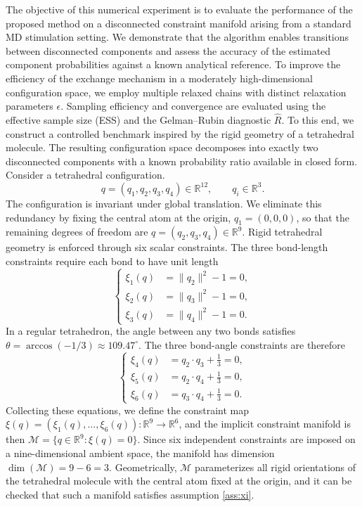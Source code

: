 \documentclass[12pt]{article}
\begin{document}
The objective of this numerical experiment is to evaluate the performance of the proposed method on a disconnected constraint manifold arising from a standard MD stimulation setting. We demonstrate that the algorithm enables transitions between disconnected components and assess the accuracy of the estimated component probabilities against a known analytical reference.
To improve the efficiency of the exchange mechanism in a moderately high-dimensional configuration space, we employ multiple relaxed chains with distinct relaxation parameters $\epsilon$. Sampling efficiency and convergence are evaluated using the effective sample size (ESS) and the Gelman--Rubin diagnostic $\hat{R}$.
To this end, we construct a controlled benchmark inspired by the rigid geometry of a tetrahedral molecule. The resulting configuration space decomposes into exactly two disconnected components with a known probability ratio available in closed form.
Consider a tetrahedral configuration.
\[
  q = (q_1, q_2, q_3, q_4) \in \mathbb{R}^{12}, \qquad q_i \in \mathbb{R}^3.
\]
The configuration is invariant under global translation.  We eliminate this
redundancy by fixing the central atom at the origin, $q_1 = (0,0,0)$, so that
the remaining degrees of freedom are
\(
  q = (q_2, q_3, q_4) \in \mathbb{R}^9.
\)
Rigid tetrahedral geometry is enforced through six scalar constraints.  The three
bond-length constraints require each bond to have unit length
\[
\left\{
\begin{aligned}
  \xi_1(q) &= \|q_2\|^2 - 1 = 0, \\
  \xi_2(q) &= \|q_3\|^2 - 1 = 0, \\
  \xi_3(q) &= \|q_4\|^2 - 1 = 0.
\end{aligned}
\right.
\]
In a regular tetrahedron, the angle between any two bonds satisfies
$\theta = \arccos(-1/3) \approx 109.47^\circ$.
The three bond-angle constraints are therefore
\[
\left\{
\begin{aligned}
  \xi_4(q) &= q_2 \cdot q_3 + \tfrac{1}{3} = 0, \\
  \xi_5(q) &= q_2 \cdot q_4 + \tfrac{1}{3} = 0, \\
  \xi_6(q) &= q_3 \cdot q_4 + \tfrac{1}{3} = 0.
\end{aligned}
\right.
\]
Collecting these equations, we define the constraint map
$\xi(q) = (\xi_1(q), \ldots, \xi_6(q)) : \mathbb{R}^9 \to \mathbb{R}^6$,
and the implicit constraint manifold is then
\(
  \mathcal{M} = \{ q \in \mathbb{R}^9 : \xi(q) = 0 \}.
\)
Since six independent constraints are imposed on a nine-dimensional ambient
space, the manifold has dimension $\dim(\mathcal{M}) = 9 - 6 = 3$.
Geometrically, $\mathcal{M}$ parameterizes all rigid orientations of the
tetrahedral molecule with the central atom fixed at the origin, and it can be checked that such a manifold satisfies assumption \ref{ass:xi}.
\end{document}

